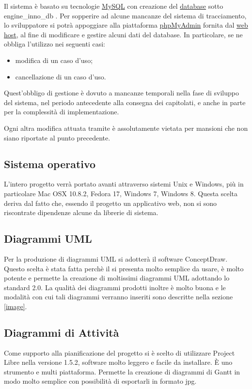 Il sistema è basato su tecnologie \underline{MySQL} con creazione del \underline{database} sotto engine\_inno\_db . Per sopperire ad alcune mancanze del sistema di tracciamento, lo sviluppatore si potrà appoggiare alla piattaforma \underline{phpMyAdmin} fornita dal \underline{web host}, al fine di modificare e gestire alcuni dati del database. In particolare, se ne obbliga l'utilizzo nei seguenti casi:
\begin{itemize}
\item modifica di un caso d'uso;
\item cancellazione di un caso d'uso.
\end{itemize}

Quest'obbligo di gestione è dovuto a mancanze temporali nella fase di sviluppo del sistema, nel periodo antecedente alla consegna dei capitolati, e anche in parte per la complessità di implementazione.

Ogni altra modifica attuata tramite  è assolutamente vietata per mansioni che non siano riportate al punto precedente.


\subsection{Sistema operativo}
L'intero progetto verrà portato avanti attraverso sistemi Unix e Windows, più in particolare Mac OSX 10.8.2, Fedora 17, Windows 7, Windows 8. Questa scelta deriva dal fatto che, essendo il progetto \caName{} un applicativo web, non si sono riscontrate dipendenze alcune da librerie di sistema.

\subsection{Diagrammi UML}
Per la produzione di diagrammi UML si adotterà il software ConceptDraw. Questo scelta è stata fatta perchè il  si presenta molto semplice da usare, è molto potente e permette la creazione di moltissimi diagrammi UML adottando lo standard 2.0. La qualità dei diagrammi prodotti inoltre\label{analisi_statica} è molto buona e le modalità con cui tali diagrammi verranno inseriti sono descritte nella sezione \ref{image}.


\subsection{Diagrammi di Attività}
Come supporto alla pianificazione del progetto si è scelto di utilizzare Project Libre nella versione 1.5.2, software molto leggero e facile da installare. È uno strumento  e multi piattaforma. Permette la creazione di diagrammi di Gantt in modo molto semplice con possibilità di esportarli in formato jpg.

